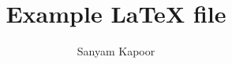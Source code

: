 \documentclass{article}
\title{Example \LaTeX{ }file}
\author{Sanyam Kapoor}
\begin{document}
\maketitle

\inputminted{python}{test.py}
\end{document}
